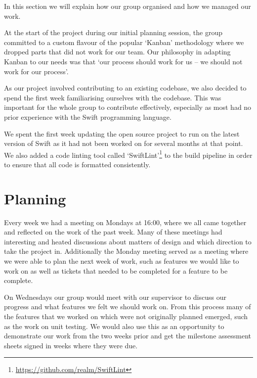 In this section we will explain how our group organised and how we managed our work.

At the start of the project during our initial planning session, the group committed to a custom flavour of the popular `Kanban' methodology where we dropped parts that did not work for our team. Our philosophy in adapting Kanban to our needs was that `our process should work for us – we should not work for our process'.

As our project involved contributing to an existing codebase, we also decided to spend the first week familiarising ourselves with the codebase. This was important for the whole group to contribute effectively, especially as most had no prior experience with the Swift programming language.

We spent the first week updating the open source project to run on the latest version of Swift as it had not been worked on for several months at that point. We also added a code linting tool called `SwiftLint'\footnote{\url{https://github.com/realm/SwiftLint}} to the build pipeline in order to ensure that all code is formatted consistently.

\section{Planning}

Every week we had a meeting on Mondays at 16:00, where we all came together and reflected on the work of the past week. Many of these meetings had interesting and heated discussions about matters of design and which direction to take the project in. Additionally the Monday meeting served as a meeting where we were able to plan the next week of work, such as features we would like to work on as well as tickets that needed to be completed for a feature to be complete.

On Wednesdays our group would meet with our supervisor to discuss our progress and what features we felt we should work on. From this process many of the features that we worked on which were not originally planned emerged, such as the work on unit testing. We would also use this as an opportunity to demonstrate our work from the two weeks prior and get the milestone assessment sheets signed in weeks where they were due.

